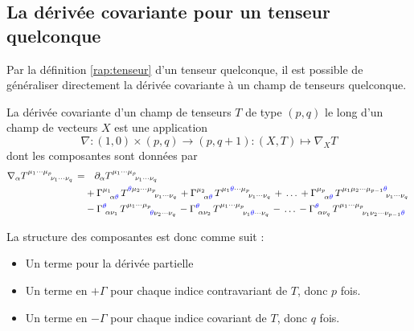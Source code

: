 \subsection{La dérivée covariante pour un tenseur quelconque}
Par la définition \ref{rap:tenseur} d'un tenseur quelconque, il est possible de généraliser directement la dérivée covariante à un champ de tenseurs quelconque.
\begin{theoremframe}
    \begin{defi}
        \label{def: connexion tenseur}
        La dérivée covariante d'un champ de tenseurs $T$ de type $(p,q)$ le long d'un champ de vecteurs $X$ est une application
        \begin{equation}
            \nabla :(1,0) \times (p,q) \to (p,q+1): (X,T) \mapsto \nabla_X T
        \end{equation}
        dont les composantes sont données par
        \begin{align*}
            \nabla_{\alpha}T\indices{^{\mu_1 \cdots \mu_p}_{\nu_1 \cdots \nu_q}} =& \quad \partial_{\alpha}T\indices{^{\mu_1 \cdots \mu_p}_{\nu_1 \cdots \nu_q} }\\
            &+ \Gamma\indices{^{\mu_1}_{\!\alpha \textcolor{blue}{\theta}}}\,T\indices{^{\textcolor{blue}{\theta} \mu_2 \cdots \mu_p}_{\nu_1 \cdots \nu_q}} + \Gamma\indices{^{\mu_2}_{\!\alpha \textcolor{blue}{\theta}}}\,T\indices{^{\mu_1 \textcolor{blue}{\theta} \cdots \mu_p}_{\nu_1 \cdots \nu_q}} + \,\dots\, + \Gamma\indices{^{\mu_p}_{\!\alpha \textcolor{blue}{\theta}}}\,T\indices{^{\mu_1 \mu_2  \cdots \mu_{p-1}\textcolor{blue}{\theta}}_{\nu_1 \cdots \nu_q}} \\
            &- \Gamma\indices{^{\textcolor{blue}{\theta}}_{\!\alpha \nu_1}}\,T\indices{^{\mu_1 \cdots \mu_p}_{\textcolor{blue}{\theta} \nu_2 \cdots \nu_q}} -\Gamma\indices{^{\textcolor{blue}{\theta}}_{\!\alpha \nu_2}}\,T\indices{^{\mu_1 \cdots \mu_p}_{\nu_1 \textcolor{blue}{\theta} \cdots \nu_q}} - \,\dots\, - \Gamma\indices{^{\textcolor{blue}{\theta}}_{\!\alpha \nu_q}}\,T\indices{^{\mu_1 \cdots \mu_p}_{\nu_1 \nu_2 \cdots \nu_{p-1}\textcolor{blue}{\theta}}}
        \end{align*}
    \end{defi}
\end{theoremframe}
La structure des composantes est donc comme suit :
\begin{itemize}
    \item Un terme pour la dérivée partielle
    \item Un terme en $+\Gamma$ pour chaque indice contravariant de $T$, donc $p$ fois.
    \item Un terme en $-\Gamma$ pour chaque indice covariant de $T$, donc $q$ fois.
\end{itemize}
